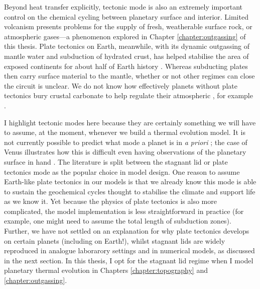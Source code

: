 Beyond heat transfer explicitly, tectonic mode is also an extremely important control on the chemical cycling between planetary surface and interior. Limited volcanism presents problems for the supply of fresh, weatherable surface rock, or atmospheric gases---a phenomenon explored in Chapter \ref{chapter:outgassing} of this thesis. Plate tectonics on Earth, meanwhile, with its dynamic outgassing of mantle water and subduction of hydrated crust, has helped stabilise the area of exposed continents for about half of Earth history \citep{kasting_what_1992, korenaga_global_2017, honing_longterm_2018}. Whereas subducting plates then carry surface material to the mantle, whether or not other regimes can close the circuit is unclear. We do not know how effectively planets without plate tectonics bury crustal carbonate to help regulate their atmospheric , for example \citep[e.g.,][]{elkins-tanton_volcanism_2007, foley_carbon_2018, honing_longterm_2018, honing_carbon_2019, honing_early_2021, rolf_dynamics_2022}. %




I highlight tectonic modes here because they are certainly something we will have to assume, at the moment, whenever we build a thermal evolution model. It is not currently possible to predict what mode a planet is in \textit{a priori} \citep{korenaga_plate_2012, lenardic_notion_2012, lenardic_solar_2016, weller_evolution_2018, ballmer_diversity_2021}; the case of Venus illustrates how this is difficult even having observations of the planetary surface in hand \citep[e.g.,][]{davaille_experimental_2017, rolf_dynamics_2022}. The literature is split between the stagnant lid or plate tectonics mode as the popular choice in model design. One reason to assume Earth-like plate tectonics in our models is that we already know this mode is able to sustain the geochemical cycles thought to stabilise the climate and support life as we know it. Yet because the physics of plate tectonics is also more complicated, the model implementation is less straightforward in practice (for example, one might need to assume the total length of subduction zones). Further, we have not settled on an explanation for why plate tectonics develops on certain planets (including on Earth!), whilst stagnant lids are widely reproduced in analogue laborarory settings and in numerical models, as discussed in the next section. In this thesis, I opt for the stagnant lid regime when I model planetary thermal evolution in Chapters \ref{chapter:topography} and \ref{chapter:outgassing}.


